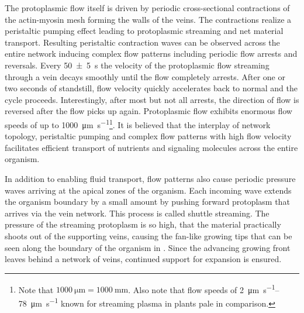 		The protoplasmic flow itself is driven by periodic cross-sectional contractions of the actin-myosin mesh forming the walls of the veins. The contractions realize a peristaltic pumping effect leading to protoplasmic streaming and net material transport. Resulting peristaltic contraction waves can be observed across the entire network inducing complex flow patterns including periodic flow arrests and reversals. Every \SI{50 \pm 5}{\second} the velocity of the protoplasmic flow streaming through a vein decays smoothly until the flow completely arrests. After one or two seconds of standstill, flow velocity quickly accelerates back to normal and the cycle proceeds. Interestingly, after most but not all arrests, the direction of flow is reversed after the flow picks up again. Protoplasmic flow exhibits enormous flow speeds of up to \SI[per-mode=symbol]{1000}{\micro\metre\per\second}\footnote{Note that $\SI{1000}{\micro\metre} = \SI{1000}{\milli\metre}$. Also note that flow speeds of \SIrange[per-mode=symbol]{2}{78}{\micro\metre\per\second} known for streaming plasma in plants pale in comparison.}. It is believed that the interplay of network topology, peristaltic pumping and complex flow patterns with high flow velocity facilitates efficient transport of nutrients and signaling molecules across the entire organism. 

		In addition to enabling fluid transport, flow patterns also cause periodic pressure waves arriving at the apical zones of the organism. Each incoming wave extends the organism boundary by a small amount by pushing forward protoplasm that arrives via the vein network. This process is called shuttle streaming. The pressure of the streaming protoplasm is so high, that the material practically shoots out of the supporting veins, causing the fan-like growing tips that can be seen along the boundary of the organism in . Since the advancing growing front leaves behind a network of veins, continued support for expansion is ensured.

